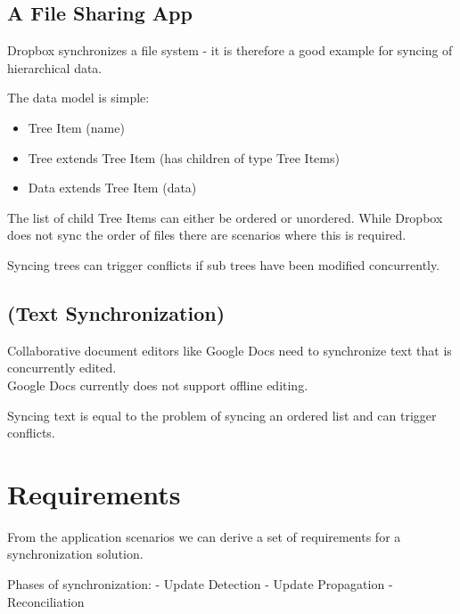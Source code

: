 \subsection{A File Sharing App}

Dropbox synchronizes a file system - it is therefore a good example for
syncing of hierarchical data.

The data model is simple:

\begin{itemize}
\item Tree Item (name)
\item Tree extends Tree Item (has children of type Tree Items)
\item Data extends Tree Item (data)
\end{itemize}

The list of child Tree Items can either be ordered or unordered. While
Dropbox does not sync the order of files there are scenarios where this
is required.

Syncing trees can trigger conflicts if sub trees have been modified
concurrently.

\subsection{(Text Synchronization)}

Collaborative document editors like Google Docs need to synchronize text
that is concurrently edited.\\Google Docs currently does not support
offline editing.

Syncing text is equal to the problem of syncing an ordered list and can
trigger conflicts.

\section{Requirements}
\label{sec:requirements}
From the application scenarios we can derive a set of requirements for a synchronization solution.

Phases of synchronization:
- Update Detection
- Update Propagation
- Reconciliation

